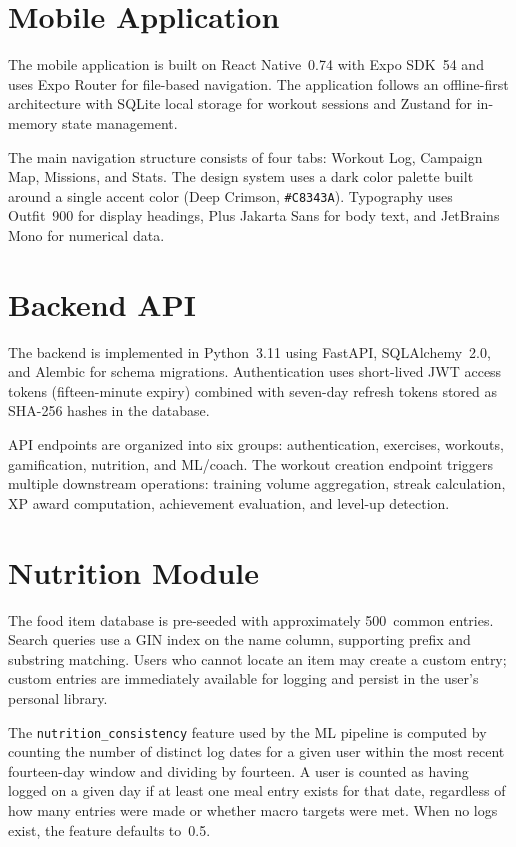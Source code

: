 \documentclass[12pt, a4paper]{report}
\begin{document}
\section{Mobile Application}

The mobile application is built on React Native~0.74 with Expo SDK~54 and uses Expo Router for file-based navigation. The application follows an offline-first architecture with SQLite local storage for workout sessions and Zustand for in-memory state management.

The main navigation structure consists of four tabs: Workout Log, Campaign Map, Missions, and Stats. The design system uses a dark color palette built around a single accent color (Deep Crimson, \texttt{\#C8343A}). Typography uses Outfit~900 for display headings, Plus Jakarta Sans for body text, and JetBrains Mono for numerical data.

\section{Backend API}

The backend is implemented in Python~3.11 using FastAPI, SQLAlchemy~2.0, and Alembic for schema migrations. Authentication uses short-lived JWT access tokens (fifteen-minute expiry) combined with seven-day refresh tokens stored as SHA-256 hashes in the database.

API endpoints are organized into six groups: authentication, exercises, workouts, gamification, nutrition, and ML/coach. The workout creation endpoint triggers multiple downstream operations: training volume aggregation, streak calculation, XP award computation, achievement evaluation, and level-up detection.

\section{Nutrition Module}

The food item database is pre-seeded with approximately 500~common entries. Search queries use a GIN index on the name column, supporting prefix and substring matching. Users who cannot locate an item may create a custom entry; custom entries are immediately available for logging and persist in the user's personal library.

The \texttt{nutrition\_consistency} feature used by the ML pipeline is computed by counting the number of distinct log dates for a given user within the most recent fourteen-day window and dividing by fourteen. A user is counted as having logged on a given day if at least one meal entry exists for that date, regardless of how many entries were made or whether macro targets were met. When no logs exist, the feature defaults to~0.5.
\end{document}
